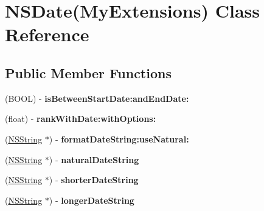\hypertarget{interface_n_s_date_07_my_extensions_08}{
\section{NSDate(MyExtensions) Class Reference}
\label{interface_n_s_date_07_my_extensions_08}
}
\subsection*{Public Member Functions}
\begin{DoxyCompactItemize}
\item 
\hypertarget{interface_n_s_date_07_my_extensions_08_a28d65f97a7e570e76cacaed57d287bc1}{
(BOOL) -\/ {\bfseries isBetweenStartDate:andEndDate:}}
\label{interface_n_s_date_07_my_extensions_08_a28d65f97a7e570e76cacaed57d287bc1}

\item 
\hypertarget{interface_n_s_date_07_my_extensions_08_ac249475080d68508654b07cee149118b}{
(float) -\/ {\bfseries rankWithDate:withOptions:}}
\label{interface_n_s_date_07_my_extensions_08_ac249475080d68508654b07cee149118b}

\item 
\hypertarget{interface_n_s_date_07_my_extensions_08_ae71c6f2a03ef771f413ec8d647958f2e}{
(\hyperlink{class_n_s_string}{NSString} $\ast$) -\/ {\bfseries formatDateString:useNatural:}}
\label{interface_n_s_date_07_my_extensions_08_ae71c6f2a03ef771f413ec8d647958f2e}

\item 
\hypertarget{interface_n_s_date_07_my_extensions_08_a16e024825432ded9212fabb07001a4cc}{
(\hyperlink{class_n_s_string}{NSString} $\ast$) -\/ {\bfseries naturalDateString}}
\label{interface_n_s_date_07_my_extensions_08_a16e024825432ded9212fabb07001a4cc}

\item 
\hypertarget{interface_n_s_date_07_my_extensions_08_a8baf1d18d529fe182a79e9c8a10fb79d}{
(\hyperlink{class_n_s_string}{NSString} $\ast$) -\/ {\bfseries shorterDateString}}
\label{interface_n_s_date_07_my_extensions_08_a8baf1d18d529fe182a79e9c8a10fb79d}

\item 
\hypertarget{interface_n_s_date_07_my_extensions_08_a980b71e7ec082857f1a4014b683bfbb7}{
(\hyperlink{class_n_s_string}{NSString} $\ast$) -\/ {\bfseries longerDateString}}
\label{interface_n_s_date_07_my_extensions_08_a980b71e7ec082857f1a4014b683bfbb7}

\end{DoxyCompactItemize}
